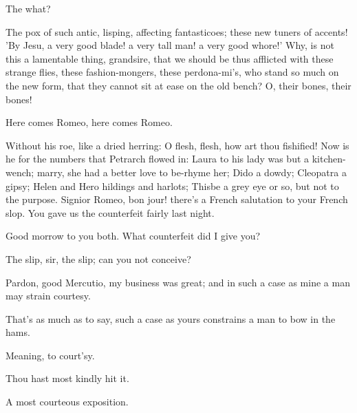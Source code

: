 \begin{speech}
The what?
\end{speech}
\begin{speech}
The pox of such antic, lisping, affecting
fantasticoes; these new tuners of accents!
'By Jesu, a very good blade! a very tall man!
a very good whore!' Why, is not this a lamentable
thing, grandsire, that we should be
thus afflicted with these strange flies, these
fashion-mongers, these perdona-mi's, who stand
so much on the new form, that they cannot
sit at ease on the old bench? O, their bones,
their bones! 
\end{speech}
\begin{speech}
Here comes Romeo, here comes Romeo.
\end{speech}
\begin{speech}
Without his roe, like a dried herring:
O flesh, flesh, how art thou fishified!
Now is he for the numbers that Petrarch
flowed in: Laura to his lady was but a kitchen-wench;
marry, she had a better love to be-rhyme
her; Dido a dowdy; Cleopatra a
gipsy; Helen and Hero hildings and harlots;
Thisbe a grey eye or so, but not to the purpose.
Signior Romeo, bon jour! there's a French salutation
to your French slop. You gave us the counterfeit
fairly last night.
\end{speech}
\begin{speech}
Good morrow to you both. What
counterfeit did I give you?
\end{speech}
\begin{speech}
The slip, sir, the slip; can you not
conceive?
\end{speech}
\begin{speech}
Pardon, good Mercutio, my business
was great; and in such a case as mine a man
may strain courtesy.
\end{speech}
\begin{speech}
That's as much as to say, such a
case as yours constrains a man to bow in the
hams.
\end{speech}
\begin{speech}
Meaning, to court'sy.
\end{speech}
\begin{speech}
Thou hast most kindly hit it.
\end{speech}
\begin{speech}
A most courteous exposition. \\
\end{speech}
